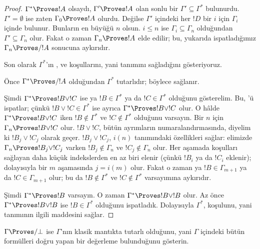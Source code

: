 \documentclass[../../../include/open-logic-section]{subfiles}
\begin{document}
\begin{proof}
  $\Gamma^*\Proves !A$ olsaydı, $\Gamma'\Proves !A$ olan sonlu bir
  $\Gamma'\subseteq\Gamma^*$ bulunurdu. $\Gamma'=\emptyset$ ise zaten
  $\Gamma_0\Proves !A$ olurdu. Değilse $\Gamma'$ içindeki her $!D$ bir
  $i$ için $\Gamma_i$ içinde bulunur. Bunların en büyüğü $n$ olsun.
  $i\leq n$ ise $\Gamma_i\subseteq\Gamma_n$ olduğundan
  $\Gamma'\subseteq\Gamma_n$ olur. Fakat o zaman
  $\Gamma_n\Proves !A$ elde edilir; bu, yukarıda ispatladığımız
  $\Gamma_n\Proves/ !A$ sonucuna aykırıdır.

  Son olarak $\Gamma^*$'ın ,  ve
   koşullarını, yani  tanımını
  sağladığını gösteriyoruz.

  Önce $\Gamma^*\Proves/ !A$ olduğundan $\Gamma^*$ tutarlıdır; böylece
   sağlanır.

  Şimdi $\Gamma^*\Proves !B\lor !C$ ise ya $!B\in\Gamma^*$ ya da
  $!C\in\Gamma^*$ olduğunu gösterelim. Bu, 'ü
  ispatlar; çünkü $!B\lor !C\in\Gamma^*$ ise ayrıca
  $\Gamma^*\Proves !B\lor !C$ olur. O hâlde
  $\Gamma^*\Proves !B\lor !C$ iken $!B\notin\Gamma^*$ ve
  $!C\notin\Gamma^*$ olduğunu varsayın. Bir $n$ için
  $\Gamma_n\Proves !B\lor !C$ olur. $!B\lor !C$, bütün ayrımların
  numaralandırmasında, diyelim ki $!B_j\lor !C_j$ olarak geçer.
  $!B_j\lor !C_j$, $i(n)$ tanımındaki özellikleri sağlar: elimizde
  $\Gamma_n\Proves !B_j\lor !C_j$ varken $!B_j\notin\Gamma_n$ ve
  $!C_j\notin\Gamma_n$ olur. Her aşamada koşulları sağlayan daha küçük
  indekslerden en az biri elenir (çünkü $!B_i$ ya da $!C_i$ eklenir);
  dolayısıyla bir $m$ aşamasında $j=i(m)$ olur. Fakat o zaman ya
  $!B\in\Gamma_{m+1}$ ya da $!C\in\Gamma_{m+1}$ olur; bu da
  $!B\notin\Gamma^*$ ve $!C\notin\Gamma^*$ varsayımına aykırıdır.

  Şimdi $\Gamma^*\Proves !B$ varsayın. O zaman
  $\Gamma^*\Proves !B\lor !B$ olur. Az önce
  $\Gamma^*\Proves !B\lor !B$ ise $!B\in\Gamma^*$ olduğunu ispatladık.
  Dolayısıyla $\Gamma^*$,  koşulunu, yani
   tanımının ilgili maddesini sağlar.
\end{proof}

\begin{prob}
$\Gamma\Proves/\bot$ ise $\Gamma$'nın klasik mantıkta tutarlı olduğunu,
yani $\Gamma$ içindeki bütün formülleri doğru yapan bir değerleme bulunduğunu
gösterin.
\end{prob}
\end{document}

